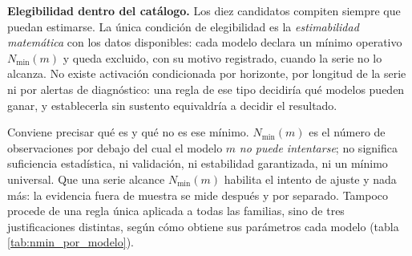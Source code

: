 \documentclass[12pt,letterpaper]{article}
\begin{document}
\textbf{Elegibilidad dentro del catálogo.} Los diez candidatos compiten siempre que puedan estimarse. La única condición de elegibilidad es la \emph{estimabilidad matemática} con los datos disponibles: cada modelo declara un mínimo operativo \(N_{\min}(m)\) y queda excluido, con su motivo registrado, cuando la serie no lo alcanza. No existe activación condicionada por horizonte, por longitud de la serie ni por alertas de diagnóstico: una regla de ese tipo decidiría qué modelos pueden ganar, y establecerla sin sustento equivaldría a decidir el resultado.

Conviene precisar qué es y qué no es ese mínimo. \(N_{\min}(m)\) es el número de observaciones por debajo del cual el modelo \(m\) \emph{no puede intentarse}; no significa suficiencia estadística, ni validación, ni estabilidad garantizada, ni un mínimo universal. Que una serie alcance \(N_{\min}(m)\) habilita el intento de ajuste y nada más: la evidencia fuera de muestra se mide después y por separado. Tampoco procede de una regla única aplicada a todas las familias, sino de tres justificaciones distintas, según cómo obtiene sus parámetros cada modelo (tabla \ref{tab:nmin_por_modelo}).
\end{document}

